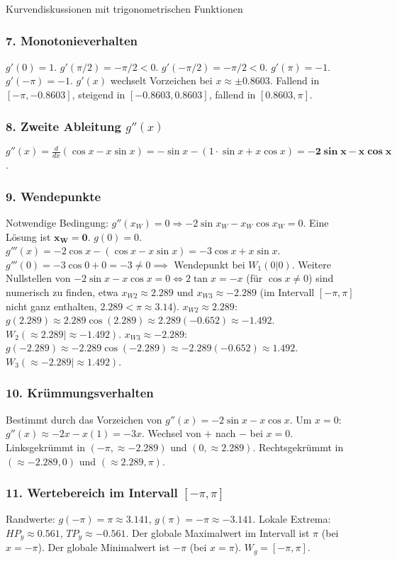 \begin{loesungsumgebung}{Kurvendiskussionen mit trigonometrischen Funktionen}
\begin{enumerate}[label=(\alph*)]
    \subsubsection*{7. Monotonieverhalten}
    $g'(0)=1$. $g'(\pi/2)=-\pi/2 < 0$. $g'(-\pi/2)=-\pi/2 < 0$. $g'(\pi)=-1$. $g'(-\pi)=-1$.
    $g'(x)$ wechselt Vorzeichen bei $x \approx \pm 0.8603$.
    Fallend in $[-\pi, -0.8603]$, steigend in $[-0.8603, 0.8603]$, fallend in $[0.8603, \pi]$.

    \subsubsection*{8. Zweite Ableitung $g''(x)$}
    $g''(x) = \frac{d}{dx}(\cos x - x\sin x) = -\sin x - (1\cdot\sin x + x\cos x) = \mathbf{-2\sin x - x\cos x}$.

    \subsubsection*{9. Wendepunkte}
    Notwendige Bedingung: $g''(x_W)=0 \Rightarrow -2\sin x_W - x_W\cos x_W = 0$.
    Eine Lösung ist $\mathbf{x_W=0}$. $g(0)=0$.
    $g'''(x) = -2\cos x - (\cos x - x\sin x) = -3\cos x + x\sin x$.
    $g'''(0) = -3\cos 0 + 0 = -3 \neq 0 \implies$ Wendepunkt bei $W_1(0|0)$.
    Weitere Nullstellen von $-2\sin x - x\cos x = 0 \Leftrightarrow 2\tan x = -x$ (für $\cos x \ne 0$) sind numerisch zu finden, etwa $x_{W2} \approx 2.289$ und $x_{W3} \approx -2.289$ (im Intervall $[-\pi,\pi]$ nicht ganz enthalten, $2.289 < \pi \approx 3.14$).
    $x_{W2} \approx 2.289$: $g(2.289) \approx 2.289 \cos(2.289) \approx 2.289(-0.652) \approx -1.492$. $W_2(\approx 2.289 | \approx -1.492)$.
    $x_{W3} \approx -2.289$: $g(-2.289) \approx -2.289 \cos(-2.289) \approx -2.289(-0.652) \approx 1.492$. $W_3(\approx -2.289 | \approx 1.492)$.

    \subsubsection*{10. Krümmungsverhalten}
    Bestimmt durch das Vorzeichen von $g''(x) = -2\sin x - x\cos x$.
    Um $x=0$: $g''(x) \approx -2x - x(1) = -3x$. Wechsel von $+$ nach $-$ bei $x=0$.
    Linksgekrümmt in $(-\pi, \approx -2.289)$ und $(0, \approx 2.289)$.
    Rechtsgekrümmt in $(\approx -2.289, 0)$ und $(\approx 2.289, \pi)$.

    \subsubsection*{11. Wertebereich im Intervall $[-\pi, \pi]$}
    Randwerte: $g(-\pi)=\pi \approx 3.141$, $g(\pi)=-\pi \approx -3.141$.
    Lokale Extrema: $HP_y \approx 0.561$, $TP_y \approx -0.561$.
    Der globale Maximalwert im Intervall ist $\pi$ (bei $x=-\pi$). Der globale Minimalwert ist $-\pi$ (bei $x=\pi$).
    $W_g = [-\pi, \pi]$.
\end{enumerate}


\end{loesungsumgebung}
